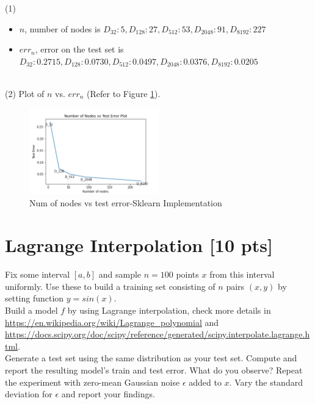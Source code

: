 \documentclass[a4paper]{article}
\theoremstyle{definition}
\newenvironment{soln}{
    \leavevmode\color{blue}\ignorespaces
}{}
\begin{document}
\begin{soln}
(1)
    \begin{itemize}
        \item $n$, number of nodes is $D_{32}: 5, D_{128}: 27, D_{512}: 53, D_{2048}: 91, D_{8192}: 227$
        \item  $err_n$, error on the test set is $D_{32}: 0.2715, D_{128}: 0.0730, D_{512}: 0.0497, D_{2048}: 0.0376, D_{8192}: 0.0205$
    \end{itemize} \\
(2) Plot of $n$ vs. $err_n$ (Refer to Figure \ref{fig:q3nodeerror}).\\

\begin{figure}[h!]
        \centering
        \includegraphics[width=0.5\textwidth]{images/q3_errorVsnode.png}
        \caption{Num of nodes vs test error-Sklearn Implementation}
        \label{fig:q3nodeerror}
    \end{figure}
\end{soln}

\section{Lagrange Interpolation [10 pts]}
Fix some interval $[a, b]$ and sample $n = 100$ points $x$ from this interval uniformly. Use these to build a training set consisting of $n$ pairs $(x, y)$ by setting function $y = sin(x)$. \\

Build a model $f$ by using Lagrange interpolation, check more details in \url{https://en.wikipedia.org/wiki/Lagrange_polynomial} and \url{https://docs.scipy.org/doc/scipy/reference/generated/scipy.interpolate.lagrange.html}. \\

Generate a test set using the same distribution as your test set. Compute and report the resulting model’s train and test error. What do you observe?
Repeat the experiment with zero-mean Gaussian noise $\epsilon$ added to $x$. Vary the standard deviation for $\epsilon$ and report your findings.
\end{document}
